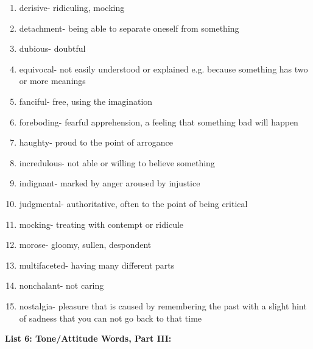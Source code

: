 \begin{enumerate}

\item derisive- ridiculing, mocking

\item detachment- being able to separate oneself from something

\item dubious- doubtful

\item equivocal- not easily understood or explained e.g. because something has two or more meanings

\item fanciful- free, using the imagination

\item foreboding- fearful apprehension, a feeling that something bad will happen

\item haughty- proud to the point of arrogance

\item incredulous- not able or willing to believe something

\item indignant- marked by anger aroused by injustice

\item judgmental- authoritative, often to the point of being critical

\item mocking- treating with contempt or ridicule

\item morose- gloomy, sullen, despondent

\item multifaceted- having many different parts

\item nonchalant- not caring

\item nostalgia-  pleasure that is caused by remembering the past with a slight hint of sadness that you can not go back to that time

\end{enumerate}

\textbf{List 6: Tone/Attitude Words, Part III:}

